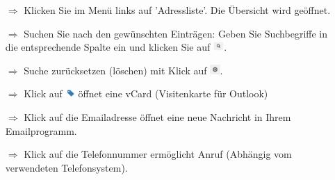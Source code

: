 \documentclass{article}
\begin{document}
\begin{multicols}{2}

\begin{tcolorbox}[colback=blue!5,colframe=blue!40!black,title=Adressliste verwenden (Grundfunktionen)]
\begin{itemize}
  \item[$\Longrightarrow$] Klicken Sie im Menü links auf 'Adressliste'. Die Übersicht wird geöffnet.
  \item[$\Longrightarrow$] Suchen Sie nach den gewünschten Einträgen: Geben Sie Suchbegriffe in die entsprechende Spalte ein und klicken Sie auf \includegraphics[height=10pt]{Icons/Lupe_s.jpg}.
  \item[$\Longrightarrow$] Suche zurücksetzen (löschen) mit Klick auf \includegraphics[height=10pt]{Icons/FilterLoeschen.jpg}.
  \item[$\Longrightarrow$] Klick auf \includegraphics[height=10pt]{Icons/vCard.jpg} öffnet eine vCard (Visitenkarte für Outlook) 
	\item[$\Longrightarrow$] Klick auf die Emailadresse öffnet eine neue Nachricht in Ihrem Emailprogramm.
	\item[$\Longrightarrow$] Klick auf die Telefonnummer ermöglicht Anruf (Abhängig vom verwendeten Telefonsystem).
\end{itemize}
\end{tcolorbox}



\end{multicols}
\end{document}
